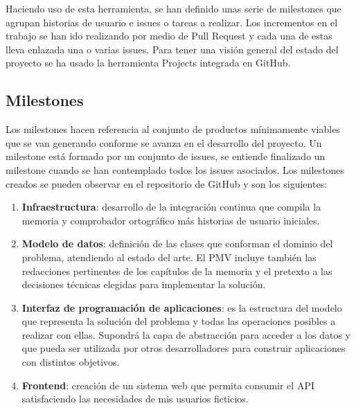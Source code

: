 Haciendo uso de esta herramienta, se han definido unas serie de milestones que agrupan
historias de usuario e issues o tareas a realizar. Los incrementos en el trabajo se han
ido realizando por medio de Pull Request y cada una de estas lleva enlazada una o varias
issues. Para tener una visión general del estado del proyecto se ha usado la herramienta
Projects integrada en GitHub.

\subsection{Milestones}
Los milestones hacen referencia al conjunto de productos mínimamente viables que se van
generando conforme se avanza en el desarrollo del proyecto. Un milestone está formado por
un conjunto de issues, se entiende finalizado un milestone cuando se han contemplado todos
los issues asociados. Los milestones creados se pueden observar en el repositorio de
GitHub y son los siguientes:
\begin{enumerate}
    \item \textbf{Infraestructura}: desarrollo de la integración continua que compila la
    memoria y comprobador ortográfico más historias de usuario iniciales.
    \item \textbf{Modelo de datos}: definición de las clases que conforman el dominio del
    problema, atendiendo al estado del arte. El PMV incluye también las redacciones
    pertinentes de los capítulos de la memoria y el pretexto a las decisiones técnicas
    elegidas para implementar la solución.
    \item \textbf{Interfaz de programación de aplicaciones}: es la estructura del modelo
    que representa la solución del problema y todas las operaciones posibles a realizar
    con ellas. Supondrá la capa de abstracción para acceder a los datos y que pueda ser
    utilizada por otros desarrolladores para construir aplicaciones con distintos
    objetivos.
    \item \textbf{Frontend}: creación de un sistema web que permita consumir el API
    satisfaciendo las necesidades de mis usuarios ficticios.
\end{enumerate}

